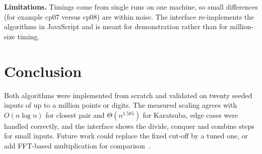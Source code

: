 \documentclass[10pt,twocolumn]{article}
\begin{document}
\textbf{Limitations.} Timings come from single runs on one machine, so small differences (for example cp07 versus cp08) are within noise. The interface re-implements the algorithms in JavaScript and is meant for demonstration rather than for million-size timing.

\section{Conclusion}
Both algorithms were implemented from scratch and validated on twenty seeded inputs of up to a million points or digits. The measured scaling agrees with $O(n\log n)$ for closest pair and $\Theta(n^{1.585})$ for Karatsuba, edge cases were handled correctly, and the interface shows the divide, conquer and combine steps for small inputs. Future work could replace the fixed cut-off by a tuned one, or add FFT-based multiplication for comparison~\cite{clrs2022}.

{\footnotesize

}
\end{document}
